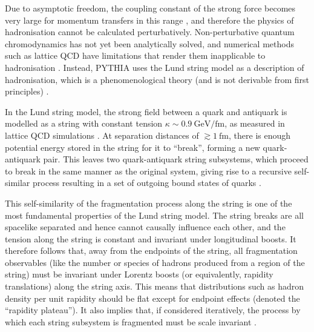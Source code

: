 \documentclass[12pt,a4paper]{report}
\begin{document}
Due to asymptotic freedom, the coupling constant of the strong force becomes very large for momentum transfers in this range \cite{Gross:1973ju,Politzer:1974fr}, and therefore the physics of hadronisation cannot be calculated perturbatively. Non-perturbative quantum chromodynamics has not yet been analytically solved, and numerical methods such as lattice QCD have limitations that render them inapplicable to hadronisation \cite{Salam:2010zt}. Instead, PYTHIA uses the Lund string model as a description of hadronisation, which is a phenomenological theory (and is not derivable from first principles) \cite{Bierlich:2022pfr,Andersson:1983ia}.

In the Lund string model, the strong field between a quark and antiquark is modelled as a string with constant tension $\kappa \sim \qty{0.9}{\giga\electronvolt\per\femto\meter}$, as measured in lattice QCD simulations \cite{Bali:1992ab,Skands:2012ts}. At separation distances of $\gtrsim \qty{1}{\femto\meter}$, there is enough potential energy stored in the string for it to ``break'', forming a new quark-antiquark pair. This leaves two quark-antiquark string subsystems, which proceed to break in the same manner as the original system, giving rise to a recursive self-similar process resulting in a set of outgoing bound states of quarks \cite{Andersson:1983ia,Andersson:1997xwk,Bierlich:2022pfr,Skands:2012ts}.

This self-similarity of the fragmentation process along the string is one of the most fundamental properties of the Lund string model. The string breaks are all spacelike separated and hence cannot causally influence each other, and the tension along the string is constant and invariant under longitudinal boosts. It therefore follows that, away from the endpoints of the string, all fragmentation observables (like the number or species of hadrons produced from a region of the string) must be invariant under Lorentz boosts (or equivalently, rapidity translations) along the string axis. This means that distributions such as hadron density per unit rapidity should be flat except for endpoint effects (denoted the ``rapidity plateau''). It also implies that, if considered iteratively, the process by which each string subsystem is fragmented must be scale invariant \cite{Andersson:1983ia,Andersson:1997xwk,Bierlich:2022pfr}.
\end{document}

